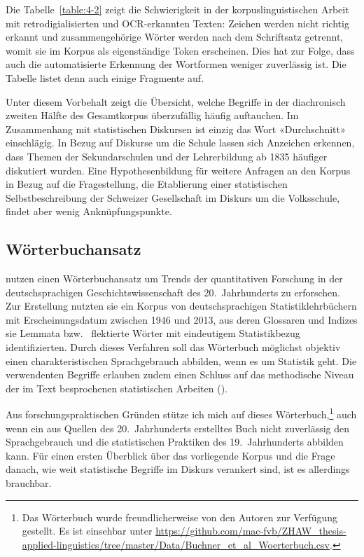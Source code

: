 Die Tabelle~\ref{table:4-2} zeigt die Schwierigkeit in der korpuslinguistischen Arbeit mit retrodigialisierten und OCR-erkannten Texten: Zeichen werden nicht richtig erkannt und zusammengehörige Wörter werden nach dem Schriftsatz getrennt, womit sie im Korpus als eigenständige Token erscheinen. Dies hat zur Folge, dass auch die automatisierte Erkennung der Wortformen weniger zuverlässig ist. Die Tabelle listet denn auch einige Fragmente auf.

Unter diesem Vorbehalt zeigt die Übersicht, welche Begriffe in der diachronisch zweiten Hälfte des Gesamtkorpus überzufällig häufig auftauchen. Im Zusammenhang mit statistischen Diskursen ist einzig das Wort «Durchschnitt» einschlägig. In Bezug auf Diskurse um die Schule lassen sich Anzeichen erkennen, dass Themen der Sekundarschulen und der Lehrerbildung ab 1835 häufiger diskutiert wurden. Eine Hypothesenbildung für weitere Anfragen an den Korpus in Bezug auf die Fragestellung, die Etablierung einer statistischen Selbstbeschreibung der Schweizer Gesellschaft im Diskurs um die Volksschule, findet aber wenig Anknüpfungspunkte.

\subsection{Wörterbuchansatz}

\citeauthor{buchner_zur_2020} nutzen einen Wörterbuchansatz um Trends der quantitativen Forschung in der deutschsprachigen Geschichtswissenschaft des 20.~Jahrhunderts zu erforschen. Zur Erstellung nutzten sie ein Korpus von deutschsprachigen Statistiklehrbüchern mit Erscheinungsdatum zwischen 1946 und 2013, aus deren Glossaren und Indizes sie  Lemmata bzw.~ flektierte Wörter mit eindeutigem Statistikbezug identifizierten. Durch dieses Verfahren soll das Wörterbuch möglichst objektiv einen charakteristischen Sprachgebrauch abbilden, wenn es um Statistik geht. Die verwendenten Begriffe erlauben zudem einen Schluss auf das methodische Niveau der im Text besprochenen statistischen Arbeiten (\cite[596-599]{buchner_zur_2020}).

Aus forschungspraktischen Gründen stütze ich mich auf dieses Wörterbuch,\footnote{Das Wörterbuch wurde freundlicherweise von den Autoren zur Verfügung gestellt. Es ist einsehbar unter \url{https://github.com/mac-fvb/ZHAW_thesis-applied-linguistics/tree/master/Data/Buchner_et_al_Woerterbuch.csv}.} auch wenn ein aus Quellen des 20.~Jahrhunderts erstelltes Buch nicht zuverlässig den Sprachgebrauch und die statistischen Praktiken des 19.~Jahrhunderts abbilden kann. Für einen ersten Überblick über das vorliegende Korpus und die Frage danach, wie weit statistische Begriffe im Diskurs verankert sind, ist es allerdings brauchbar.

